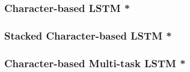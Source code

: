 \subsubsection{Character-based LSTM *}

\subsubsection{Stacked Character-based LSTM *}

\subsubsection{Character-based Multi-task LSTM *}
